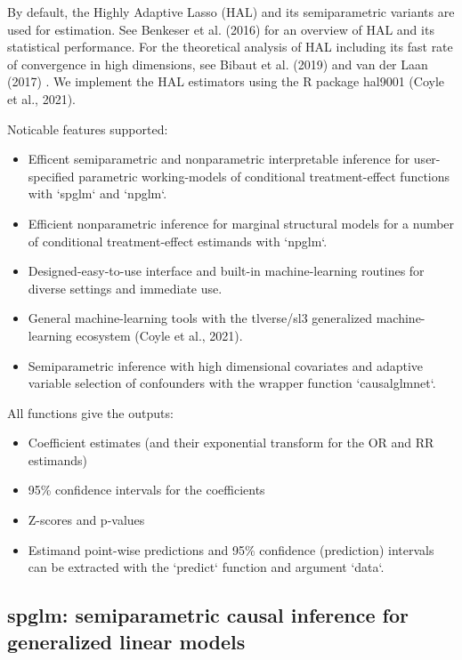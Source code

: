 \documentclass{article}
\begin{document}
By default, the Highly Adaptive Lasso (HAL) and its semiparametric variants are used for estimation. See Benkeser et al. (2016) for an overview of HAL and its statistical performance. For the theoretical analysis of HAL including its fast rate of convergence in high dimensions, see Bibaut et al. (2019) and van der Laan (2017) \nocite{bibaut2019fast}\nocite{HAL2016}\nocite{vanderlaanGenerlaTMLE}. We implement the HAL estimators using the R package hal9001 (Coyle et al., 2021).\nocite{hal1}\nocite{hal2} 
\nocite{vanderlaanGenerlaTMLE} 

Noticable features supported:
\begin{itemize}
\item Efficent semiparametric and nonparametric interpretable inference for user-specified parametric working-models of conditional treatment-effect functions with `spglm` and `npglm`.
\item  Efficient nonparametric inference for marginal structural models for a number of conditional treatment-effect estimands with `npglm`.
\item Designed-easy-to-use interface and built-in machine-learning routines for diverse settings and immediate use.
\item  General machine-learning tools with the tlverse/sl3 generalized machine-learning ecosystem (Coyle et al., 2021).\nocite{coyle2021sl3}
\item  Semiparametric inference with high dimensional covariates and adaptive variable selection of confounders with the wrapper function `causalglmnet`.
\end{itemize}

All functions give the outputs: 
\begin{itemize}
\item Coefficient estimates (and their exponential transform for the OR and RR estimands)
\item 95\% confidence intervals for the coefficients
\item Z-scores and p-values
\item Estimand point-wise predictions and 95\% confidence (prediction) intervals can be extracted with the `predict` function and argument `data`.
\end{itemize}

\subsection{spglm: semiparametric causal inference for generalized linear models}
\end{document}
